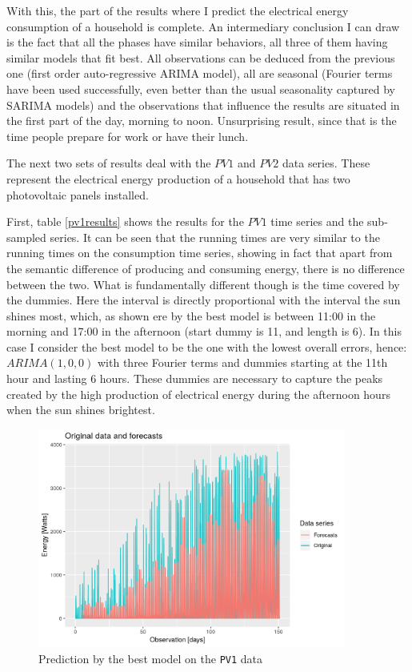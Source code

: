 \documentclass[12pt,a4paper,titlepage]{report}
\begin{document}
With this, the part of the results where I predict the electrical energy consumption of a household is complete. An intermediary conclusion I can draw is the fact that all the phases have similar behaviors, all three of them having similar models that fit best. All observations can be deduced from the previous one (first order auto-regressive ARIMA model), all are seasonal (Fourier terms have been used successfully, even better than the usual seasonality captured by SARIMA models) and the observations that influence the results are situated in the first part of the day, morning to noon. Unsurprising result, since that is the time people prepare for work or have their lunch.

The next two sets of results deal with the $PV1 $ and $ PV2 $ data series. These represent the electrical energy production of a household that has two photovoltaic panels installed.

First, table \ref{pv1results} shows the results for the $ PV1 $ time series and the sub-sampled series.
It can be seen that the running times are very similar to the running times on the consumption time series, showing in fact that apart from the semantic difference of producing and consuming energy, there is no difference between the two.
What is fundamentally different though is the time covered by the dummies. Here the interval is directly proportional with the interval the sun shines most, which, as shown ere by the best model is between 11:00 in the morning and 17:00 in the afternoon (start dummy is 11, and length is 6).
In this case I consider the best model to be the one with the lowest overall errors, hence: $ ARIMA(1, 0, 0) $ with three Fourier terms and dummies starting at the 11th hour and lasting 6 hours. These dummies are necessary to capture the peaks created by the high production of electrical energy during the afternoon hours when the sun shines brightest.

\begin{figure}[h]
    \centering
    \includegraphics[width=0.9\textwidth]{dbestpv1}
    \caption{Prediction by the best model on the \texttt{PV1} data}
    \label{dbestpv1}
\end{figure}
\end{document}
